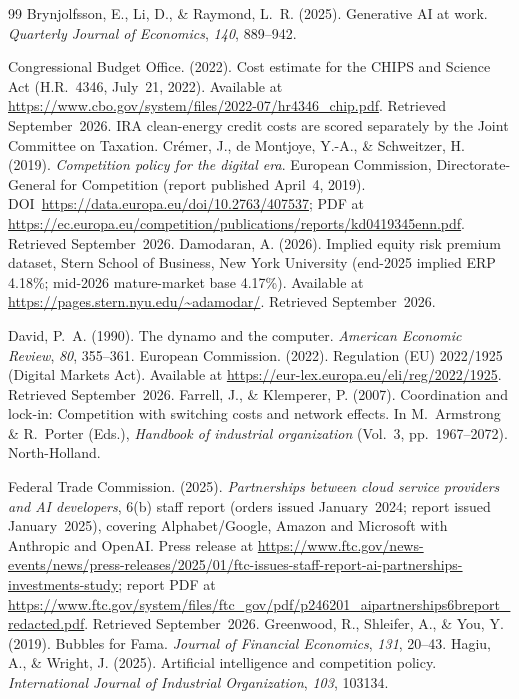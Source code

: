\documentclass[11pt,a4paper]{article}
\begin{document}
\begin{thebibliography}{99}
Brynjolfsson, E., Li, D., \& Raymond, L.~R. (2025).
Generative AI at work.
\emph{Quarterly Journal of Economics}, \emph{140}, 889--942.

Congressional Budget Office. (2022).
Cost estimate for the CHIPS and Science Act (H.R.~4346, July~21, 2022).
Available at \url{https://www.cbo.gov/system/files/2022-07/hr4346_chip.pdf}.
Retrieved September~2026. IRA clean-energy credit costs are scored
separately by the Joint Committee on Taxation.
Cr\'emer, J., de Montjoye, Y.-A., \& Schweitzer, H. (2019).
\emph{Competition policy for the digital era}.
European Commission, Directorate-General for Competition (report published
April~4, 2019). DOI~\url{https://data.europa.eu/doi/10.2763/407537};
PDF at \url{https://ec.europa.eu/competition/publications/reports/kd0419345enn.pdf}.
Retrieved September~2026.
Damodaran, A. (2026).
Implied equity risk premium dataset, Stern School of Business,
New York University (end-2025 implied ERP 4.18\%; mid-2026 mature-market
base 4.17\%).
Available at \url{https://pages.stern.nyu.edu/~adamodar/}.
Retrieved September~2026.

David, P.~A. (1990).
The dynamo and the computer.
\emph{American Economic Review}, \emph{80}, 355--361.
European Commission. (2022).
Regulation (EU) 2022/1925 (Digital Markets Act).
Available at \url{https://eur-lex.europa.eu/eli/reg/2022/1925}.
Retrieved September~2026.
Farrell, J., \& Klemperer, P. (2007).
Coordination and lock-in: Competition with switching costs and network effects.
In M.~Armstrong \& R.~Porter (Eds.),
\emph{Handbook of industrial organization} (Vol.~3, pp.~1967--2072).
North-Holland.

Federal Trade Commission. (2025).
\emph{Partnerships between cloud service providers and AI developers},
6(b) staff report (orders issued January~2024; report issued January~2025),
covering Alphabet/Google, Amazon and Microsoft with Anthropic and OpenAI.
Press release at \url{https://www.ftc.gov/news-events/news/press-releases/2025/01/ftc-issues-staff-report-ai-partnerships-investments-study};
report PDF at \url{https://www.ftc.gov/system/files/ftc_gov/pdf/p246201_aipartnerships6breport_redacted.pdf}.
Retrieved September~2026.
Greenwood, R., Shleifer, A., \& You, Y. (2019).
Bubbles for Fama.
\emph{Journal of Financial Economics}, \emph{131}, 20--43.
Hagiu, A., \& Wright, J. (2025).
Artificial intelligence and competition policy.
\emph{International Journal of Industrial Organization}, \emph{103}, 103134.


\end{thebibliography}
\end{document}
